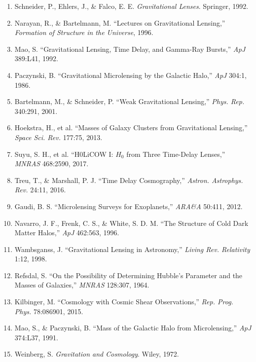 \documentclass[11pt,a4paper]{article}
\begin{document}
\begin{enumerate}
\item Schneider, P., Ehlers, J., \& Falco, E. E. \textit{Gravitational Lenses}. Springer, 1992.
\item Narayan, R., \& Bartelmann, M. ``Lectures on Gravitational Lensing,'' \textit{Formation of Structure in the Universe}, 1996.
\item Mao, S. ``Gravitational Lensing, Time Delay, and Gamma-Ray Bursts,'' \textit{ApJ} 389:L41, 1992.
\item Paczynski, B. ``Gravitational Microlensing by the Galactic Halo,'' \textit{ApJ} 304:1, 1986.
\item Bartelmann, M., \& Schneider, P. ``Weak Gravitational Lensing,'' \textit{Phys. Rep.} 340:291, 2001.
\item Hoekstra, H., et al. ``Masses of Galaxy Clusters from Gravitational Lensing,'' \textit{Space Sci. Rev.} 177:75, 2013.
\item Suyu, S. H., et al. ``H0LiCOW I: $H_0$ from Three Time-Delay Lenses,'' \textit{MNRAS} 468:2590, 2017.
\item Treu, T., \& Marshall, P. J. ``Time Delay Cosmography,'' \textit{Astron. Astrophys. Rev.} 24:11, 2016.
\item Gaudi, B. S. ``Microlensing Surveys for Exoplanets,'' \textit{ARA\&A} 50:411, 2012.
\item Navarro, J. F., Frenk, C. S., \& White, S. D. M. ``The Structure of Cold Dark Matter Halos,'' \textit{ApJ} 462:563, 1996.
\item Wambsganss, J. ``Gravitational Lensing in Astronomy,'' \textit{Living Rev. Relativity} 1:12, 1998.
\item Refsdal, S. ``On the Possibility of Determining Hubble's Parameter and the Masses of Galaxies,'' \textit{MNRAS} 128:307, 1964.
\item Kilbinger, M. ``Cosmology with Cosmic Shear Observations,'' \textit{Rep. Prog. Phys.} 78:086901, 2015.
\item Mao, S., \& Paczynski, B. ``Mass of the Galactic Halo from Microlensing,'' \textit{ApJ} 374:L37, 1991.
\item Weinberg, S. \textit{Gravitation and Cosmology}. Wiley, 1972.
\end{enumerate}
\end{document}
